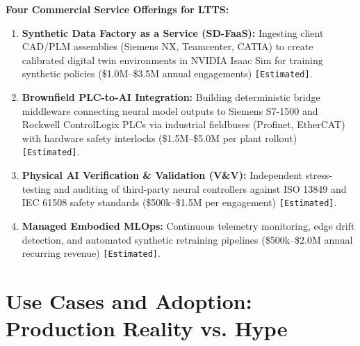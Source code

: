\documentclass[11pt,a4paper]{article}
\begin{document}
\textbf{Four Commercial Service Offerings for LTTS:}
\begin{enumerate}
    \item \textbf{Synthetic Data Factory as a Service (SD-FaaS):} Ingesting client CAD/PLM assemblies (Siemens NX, Teamcenter, CATIA) to create calibrated digital twin environments in NVIDIA Isaac Sim for training synthetic policies (\$1.0M--\$3.5M annual engagements) \texttt{[Estimated]}.
    \item \textbf{Brownfield PLC-to-AI Integration:} Building deterministic bridge middleware connecting neural model outputs to Siemens S7-1500 and Rockwell ControlLogix PLCs via industrial fieldbuses (Profinet, EtherCAT) with hardware safety interlocks (\$1.5M--\$5.0M per plant rollout) \texttt{[Estimated]}.
    \item \textbf{Physical AI Verification \& Validation (V\&V):} Independent stress-testing and auditing of third-party neural controllers against ISO 13849 and IEC 61508 safety standards (\$500k--\$1.5M per engagement) \texttt{[Estimated]}.
    \item \textbf{Managed Embodied MLOps:} Continuous telemetry monitoring, edge drift detection, and automated synthetic retraining pipelines (\$500k--\$2.0M annual recurring revenue) \texttt{[Estimated]}.
\end{enumerate}

\section{Use Cases and Adoption: Production Reality vs. Hype}
\end{document}
